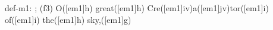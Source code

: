 def-m1: \grealign;
(f3) O([em1]h) great([em1]h) Cre([em1]iv)a([em1]jv)tor([em1]i) of([em1]i) the([em1]h) sky,([em1]g)